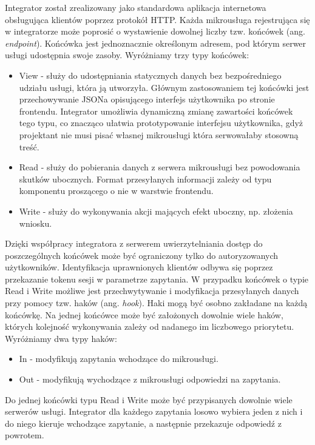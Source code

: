 \documentclass[licencjacka]{pracamgr}
\begin{document}
Integrator został zrealizowany jako standardowa aplikacja internetowa obsługująca
klientów poprzez protokół HTTP. Każda mikrousługa rejestrująca się w integratorze
może poprosić o wystawienie dowolnej liczby tzw. końcówek (ang. \textit{endpoint}).
Końcówka jest jednoznacznie określonym adresem, pod którym serwer usługi udostępnia
swoje zasoby. Wyróżniamy trzy typy końcówek:
\begin{itemize}
	\item View - służy do udostępniania statycznych danych bez bezpośredniego
	udziału usługi, która ją utworzyła. Głównym zastosowaniem tej końcówki jest
	przechowywanie JSONa opisującego interfejs użytkownika po stronie frontendu.
	Integrator umożliwia dynamiczną zmianę zawartości końcówek tego typu, co znacząco
	ułatwia prototypowanie interfejsu użytkownika, gdyż projektant nie musi pisać
	własnej mikrousługi która serwowałaby stosowną treść.
	\item Read - służy do pobierania danych z serwera mikrousługi bez powodowania
	skutków ubocznych. Format przesyłanych informacji zależy od typu komponentu
	proszącego o nie w warstwie frontendu.
	\item Write - służy do wykonywania akcji mających efekt uboczny, np. złożenia
	wniosku.
\end{itemize}

Dzięki współpracy integratora z serwerem uwierzytelniania dostęp do poszczególnych
końcówek może być ograniczony tylko do autoryzowanych użytkowników. Identyfikacja
uprawnionych klientów odbywa się poprzez przekazanie tokenu sesji w parametrze zapytania.
W przypadku końcówek o typie Read i Write możliwe jest przechwytywanie i modyfikacja
przesyłanych danych przy pomocy tzw. haków (ang. \textit{hook}). Haki mogą być
osobno zakładane na każdą końcówkę. Na jednej końcówce może być założonych dowolnie
wiele haków, których kolejność wykonywania zależy od nadanego im liczbowego priorytetu.
Wyróżniamy dwa typy haków:
\begin{itemize}
	\item In - modyfikują zapytania wchodzące do mikrousługi.
	\item Out - modyfikują wychodzące z mikrousługi odpowiedzi na zapytania.
\end{itemize}
Do jednej końcówki typu Read i Write może być przypisanych dowolnie wiele serwerów
usługi. Integrator dla każdego zapytania losowo wybiera jeden z nich i do niego
kieruje wchodzące zapytanie, a następnie przekazuje odpowiedź z powrotem.
\end{document}
